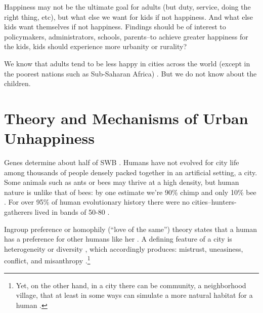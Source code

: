 \documentclass[10pt, letterpaper]{article}
\newcommand{\emd}[1]{\ExecuteMetaData[/tmp/tex]{#1}} %
\begin{document}
\begin{spacing}{1.4} %





Happiness may not be the ultimate goal for adults (but duty, service, doing the
right thing, etc), but what else we want for kids if not happiness. And what
else kids want themselves if not happiness. 
Findings should be of interest to policymakers, administrators, schools,
parents--to achieve greater happiness for the kids, kids should experience more
urbanity or rurality?

We know that adults tend to be less happy in cities across the world (except in
the poorest nations such as Sub-Saharan Africa) \citep{aok21}. But we do not
know about the children. 

\section*{Theory and Mechanisms of Urban Unhappiness}

 Genes determine about half of SWB
 \citep{schnittker08,lykken96t,brooksGenetic}.
 Humans have not
evolved for city life among thousands of people densely packed together in an
artificial setting, a city. Some animals such as ants or bees may thrive at a
high density, but human nature is unlike that of bees: by one estimate we're 90\% chimp and only 10\% bee  \citep{haidt12B}.
For over 95\% of human evolutionary history there were no cities--hunters-gatherers lived in bands of 50-80 \citep{maryanski92}. 


Ingroup preference or homophily (``love of the same'') theory
  states 
that a  human has a preference for other humans like her \citep{mcpherson01,tajfel82,tajfel71,smelser99,putnam07,christakis09f}. %
 A defining
feature of a city is heterogeneity or diversity \citep{wirth38}, which
accordingly produces: 
 mistrust, uneasiness, conflict, and misanthropy
 \citep{milgram70,thrift05,amin06}.\footnote{
 Yet, on the other hand, in a city there can be community, a neighborhood
village, that at least in some ways can simulate a more natural habitat for a
human \citep{fischer95,fischer75,jacobs93}.}


\end{spacing}
\end{document}
